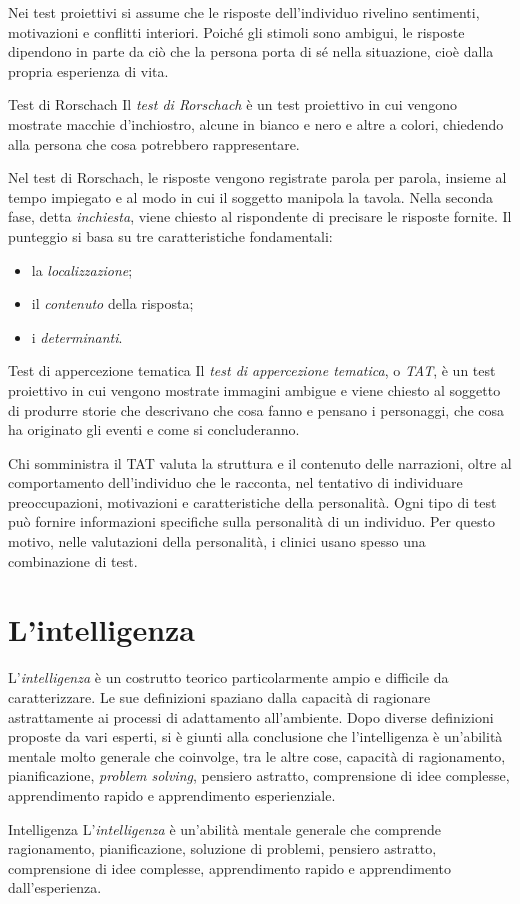 \documentclass[a4paper]{article}
\begin{document}
Nei test proiettivi si assume che le risposte dell'individuo rivelino sentimenti, motivazioni e conflitti interiori. Poiché gli stimoli sono ambigui, le risposte dipendono in parte da ciò che la persona porta di sé nella situazione, cioè dalla propria esperienza di vita.
\begin{snippetdefinition}{Test di Rorschach}
    Il \emph{test di Rorschach} è un test proiettivo in cui vengono mostrate macchie d'inchiostro, alcune in bianco e nero e altre a colori, chiedendo alla persona che cosa potrebbero rappresentare.
\end{snippetdefinition}
Nel test di Rorschach, le risposte vengono registrate parola per parola, insieme al tempo impiegato e al modo in cui il soggetto manipola la tavola. Nella seconda fase, detta \emph{inchiesta}, viene chiesto al rispondente di precisare le risposte fornite. Il punteggio si basa su tre caratteristiche fondamentali:
\begin{itemize}
    \item la \emph{localizzazione};
    \item il \emph{contenuto} della risposta;
    \item i \emph{determinanti}.
\end{itemize}
\begin{snippetdefinition}{Test di appercezione tematica}
    Il \emph{test di appercezione tematica}, o \emph{TAT}, è un test proiettivo in cui vengono mostrate immagini ambigue e viene chiesto al soggetto di produrre storie che descrivano che cosa fanno e pensano i personaggi, che cosa ha originato gli eventi e come si concluderanno.
\end{snippetdefinition}
Chi somministra il TAT valuta la struttura e il contenuto delle narrazioni, oltre al comportamento dell'individuo che le racconta, nel tentativo di individuare preoccupazioni, motivazioni e caratteristiche della personalità.
Ogni tipo di test può fornire informazioni specifiche sulla personalità di un individuo. Per questo motivo, nelle valutazioni della personalità, i clinici usano spesso una combinazione di test.

\section{L'intelligenza}
L'\emph{intelligenza} è un costrutto teorico particolarmente ampio e difficile da caratterizzare. Le sue definizioni spaziano dalla capacità di ragionare astrattamente ai processi di adattamento all'ambiente.
Dopo diverse definizioni proposte da vari esperti, si è giunti alla conclusione che l'intelligenza è un'abilità mentale molto generale che coinvolge, tra le altre cose, capacità di ragionamento, pianificazione, \emph{problem solving}, pensiero astratto, comprensione di idee complesse, apprendimento rapido e apprendimento esperienziale.
\begin{snippetdefinition}{Intelligenza}
    L'\emph{intelligenza} è un'abilità mentale generale che comprende ragionamento, pianificazione, soluzione di problemi, pensiero astratto, comprensione di idee complesse, apprendimento rapido e apprendimento dall'esperienza.
\end{snippetdefinition}
\end{document}
